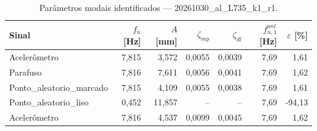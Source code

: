 \begin{table}[htbp]
  \centering
  \caption{Parâmetros modais identificados — 20261030\_al\_L735\_k1\_r1.}
  \label{tab:modal_20261030_al_L735_k1_r1}
  \begin{tabular}{lrrrrrr}
    \toprule
    Sinal & $f_n$ [Hz] & $A$ [mm] & $\zeta_{mp}$ & $\zeta_{dl}$ & $f_{n,1}^{anl}$ [Hz] & $\varepsilon$ [\%] \\
    \midrule
    Acelerômetro & 7{,}815 & 3{,}572 & 0{,}0055 & 0{,}0039 & 7{,}69 & 1{,}61 \\
    Parafuso & 7{,}816 & 7{,}611 & 0{,}0056 & 0{,}0041 & 7{,}69 & 1{,}62 \\
    Ponto\_aleatorio\_marcado & 7{,}815 & 4{,}109 & 0{,}0055 & 0{,}0038 & 7{,}69 & 1{,}61 \\
    Ponto\_aleatorio\_liso & 0{,}452 & 11{,}857 & -- & -- & 7{,}69 & -94{,}13 \\
    Acelerômetro & 7{,}816 & 4{,}537 & 0{,}0099 & 0{,}0045 & 7{,}69 & 1{,}62 \\
    \bottomrule
  \end{tabular}
\end{table}
